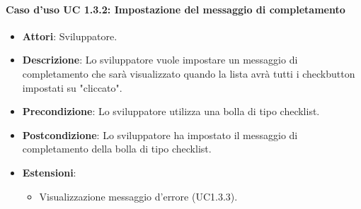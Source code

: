 \paragraph{Caso d'uso UC 1.3.2: Impostazione del messaggio di completamento}

\FloatBarrier
\begin{itemize}
\item\textbf{Attori}: Sviluppatore.
\item\textbf{Descrizione}: Lo sviluppatore vuole impostare un messaggio di completamento che sarà visualizzato quando la lista avrà tutti i checkbutton impostati su "cliccato".
\item\textbf{Precondizione}: Lo sviluppatore utilizza una bolla di tipo checklist.
\item\textbf{Postcondizione}: Lo sviluppatore ha impostato il messaggio di completamento della bolla di tipo checklist.
\item \textbf{Estensioni}: 
\begin{itemize}
\item Visualizzazione messaggio d'errore (UC1.3.3).
\end{itemize}
\end{itemize}
